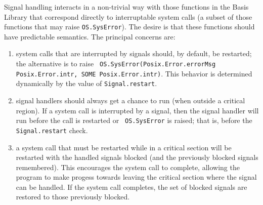 Signal handling interacts in a non-trivial way with those functions in
the Basis Library that correspond directly to interruptable system
calls (a subset of those functions that may raise {\tt OS.SysError}).
The desire is that these functions should have predictable semantics.
The principal concerns are:
\begin{enumerate}
\item 
  system calls that are interrupted by signals should, by default, be
  restarted; the alternative is to raise {\tt
    OS.SysError(Posix.Error.errorMsg Posix.Error.intr, SOME
    Posix.Error.intr)}.  This behavior is determined dynamically by
  the value of {\tt Signal.restart}.
\item 
  signal handlers should always get a chance to run (when outside a
  critical region).  If a system call is interrupted by a signal, then
  the signal handler will run before the call is restarted or {\tt
    OS.SysError} is raised; that is, before the {\tt Signal.restart}
  check.
\item 
  a system call that must be restarted while in a critical section
  will be restarted with the handled signals blocked (and the
  previously blocked signals remembered).  This encourages the system
  call to complete, allowing the program to make progess towards
  leaving the critical section where the signal can be handled.  If
  the system call completes, the set of blocked signals are restored
  to those previously blocked.
\end{enumerate}


